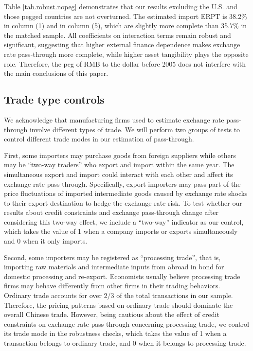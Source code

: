 \documentclass[12pt]{article}
\begin{document}
Table \ref{tab.robust.nopeg} demonstrates that our results excluding the U.S. and those pegged countries are not overturned. The estimated import ERPT is 38.2\% in column (1) and in column (5), which are slightly more complete than 35.7\% in the matched sample. All coefficients on interaction terms remain robust and significant, suggesting that higher external finance dependence makes exchange rate pass-through more complete, while higher asset tangibility plays the opposite role. Therefore, the peg of RMB to the dollar before 2005 does not interfere with the main conclusions of this paper.

\subsection{Trade type controls}

We acknowledge that manufacturing firms used to estimate exchange rate pass-through involve different types of trade. We will perform two groups of tests to control different trade modes in our estimation of pass-through.

First, some importers may purchase goods from foreign suppliers while others may be ``two-way traders'' who export and import within the same year. The simultaneous export and import could interact with each other and affect its exchange rate pass-through. Specifically, export importers may pass part of the price fluctuations of imported intermediate goods caused by exchange rate shocks to their export destination to hedge the exchange rate risk. To test whether our results about credit constraints and exchange pass-through change after considering this two-way effect, we include a ``two-way'' indicator as our control, which takes the value of 1 when a company imports or exports simultaneously and 0 when it only imports.

Second, some importers may be registered as ``processing trade'', that is, importing raw materials and intermediate inputs from abroad in bond for domestic processing and re-export. Economists usually believe processing trade firms may behave differently from other firms in their trading behaviors. Ordinary trade accounts for over 2/3 of the total transactions in our sample. Therefore, the pricing patterns based on ordinary trade should dominate the overall Chinese trade. However, being cautious about the effect of credit constraints on exchange rate pass-through concerning processing trade, we control its trade mode in the robustness checks, which takes the value of 1 when a transaction belongs to ordinary trade, and 0 when it belongs to processing trade.
\end{document}
